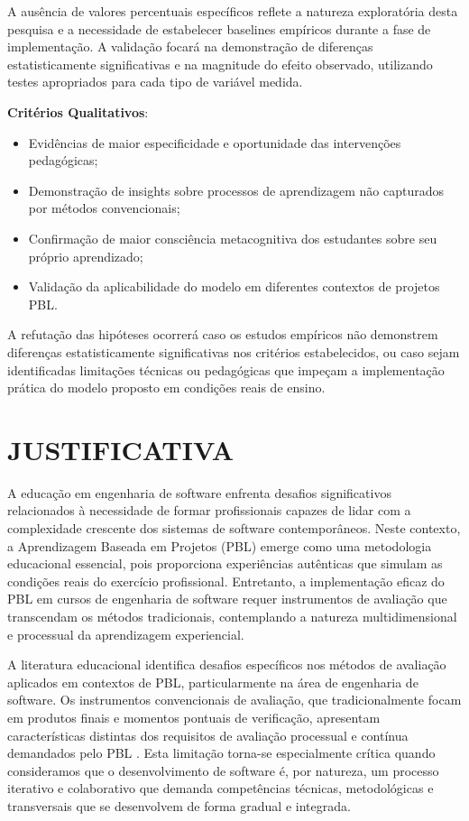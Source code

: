 \documentclass[12pt,a4paper]{article}
\renewcommand{\cite}[1]{}
\begin{document}
A ausência de valores percentuais específicos reflete a natureza exploratória
desta pesquisa e a necessidade de estabelecer baselines empíricos durante a
fase de implementação. A validação focará na demonstração de diferenças
estatisticamente significativas e na magnitude do efeito observado, utilizando
testes apropriados para cada tipo de variável medida.

\textbf{Critérios Qualitativos}:
\begin{itemize}
  \item Evidências de maior especificidade e oportunidade das intervenções pedagógicas;
  \item Demonstração de insights sobre processos de aprendizagem não capturados por
        métodos convencionais;
  \item Confirmação de maior consciência metacognitiva dos estudantes sobre seu próprio
        aprendizado;
  \item Validação da aplicabilidade do modelo em diferentes contextos de projetos PBL.
\end{itemize}

A refutação das hipóteses ocorrerá caso os estudos empíricos não demonstrem
diferenças estatisticamente significativas nos critérios estabelecidos, ou caso
sejam identificadas limitações técnicas ou pedagógicas que impeçam a
implementação prática do modelo proposto em condições reais de ensino.

\section{JUSTIFICATIVA}

A educação em engenharia de software enfrenta desafios significativos
relacionados à necessidade de formar profissionais capazes de lidar com a
complexidade crescente dos sistemas de software contemporâneos. Neste contexto,
a Aprendizagem Baseada em Projetos (PBL) emerge como uma metodologia
educacional essencial, pois proporciona experiências autênticas que simulam as
condições reais do exercício profissional. Entretanto, a implementação eficaz
do PBL em cursos de engenharia de software requer instrumentos de avaliação que
transcendam os métodos tradicionais, contemplando a natureza multidimensional e
processual da aprendizagem experiencial.

A literatura educacional identifica desafios específicos nos métodos de
avaliação aplicados em contextos de PBL, particularmente na área de engenharia
de software. Os instrumentos convencionais de avaliação, que tradicionalmente
focam em produtos finais e momentos pontuais de verificação, apresentam
características distintas dos requisitos de avaliação processual e contínua
demandados pelo PBL \cite{hmelo2004}. Esta limitação torna-se especialmente
crítica quando consideramos que o desenvolvimento de software é, por natureza,
um processo iterativo e colaborativo que demanda competências técnicas,
metodológicas e transversais que se desenvolvem de forma gradual e integrada.
\end{document}
